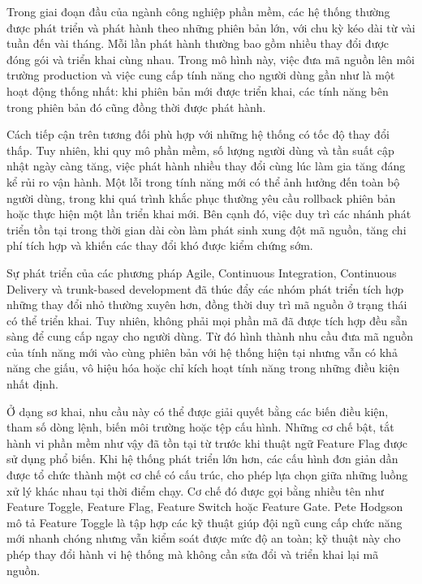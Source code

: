 \documentclass[11pt]{report}
\begin{document}
Trong giai đoạn đầu của ngành công nghiệp phần mềm, các hệ thống thường được phát triển và phát hành theo những phiên bản lớn, với chu kỳ kéo dài từ vài tuần đến vài tháng. Mỗi lần phát hành thường bao gồm nhiều thay đổi được đóng gói và triển khai cùng nhau. Trong mô hình này, việc đưa mã nguồn lên môi trường production và việc cung cấp tính năng cho người dùng gần như là một hoạt động thống nhất: khi phiên bản mới được triển khai, các tính năng bên trong phiên bản đó cũng đồng thời được phát hành.

Cách tiếp cận trên tương đối phù hợp với những hệ thống có tốc độ thay đổi thấp. Tuy nhiên, khi quy mô phần mềm, số lượng người dùng và tần suất cập nhật ngày càng tăng, việc phát hành nhiều thay đổi cùng lúc làm gia tăng đáng kể rủi ro vận hành. Một lỗi trong tính năng mới có thể ảnh hưởng đến toàn bộ người dùng, trong khi quá trình khắc phục thường yêu cầu rollback phiên bản hoặc thực hiện một lần triển khai mới. Bên cạnh đó, việc duy trì các nhánh phát triển tồn tại trong thời gian dài còn làm phát sinh xung đột mã nguồn, tăng chi phí tích hợp và khiến các thay đổi khó được kiểm chứng sớm.

Sự phát triển của các phương pháp Agile, Continuous Integration, Continuous Delivery và trunk-based development đã thúc đẩy các nhóm phát triển tích hợp những thay đổi nhỏ thường xuyên hơn, đồng thời duy trì mã nguồn ở trạng thái có thể triển khai. Tuy nhiên, không phải mọi phần mã đã được tích hợp đều sẵn sàng để cung cấp ngay cho người dùng. Từ đó hình thành nhu cầu đưa mã nguồn của tính năng mới vào cùng phiên bản với hệ thống hiện tại nhưng vẫn có khả năng che giấu, vô hiệu hóa hoặc chỉ kích hoạt tính năng trong những điều kiện nhất định.

Ở dạng sơ khai, nhu cầu này có thể được giải quyết bằng các biến điều kiện, tham số dòng lệnh, biến môi trường hoặc tệp cấu hình. Những cơ chế bật, tắt hành vi phần mềm như vậy đã tồn tại từ trước khi thuật ngữ Feature Flag được sử dụng phổ biến. Khi hệ thống phát triển lớn hơn, các cấu hình đơn giản dần được tổ chức thành một cơ chế có cấu trúc, cho phép lựa chọn giữa những luồng xử lý khác nhau tại thời điểm chạy. Cơ chế đó được gọi bằng nhiều tên như Feature Toggle, Feature Flag, Feature Switch hoặc Feature Gate. Pete Hodgson mô tả Feature Toggle là tập hợp các kỹ thuật giúp đội ngũ cung cấp chức năng mới nhanh chóng nhưng vẫn kiểm soát được mức độ an toàn; kỹ thuật này cho phép thay đổi hành vi hệ thống mà không cần sửa đổi và triển khai lại mã nguồn. \cite{fowler_feature_toggles}
\end{document}
